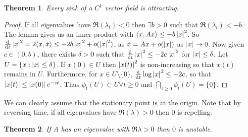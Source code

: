 \documentclass{notes}
\theoremstyle{plain}
\newtheorem*{theorem}{Theorem}
\begin{document}
\begin{theorem}
Every sink of a $C^1$ vector field is attracting.
\end{theorem}

\begin{proof}
If all eigenvalues have $\Re (\lambda_i) < 0$ then $\exists b > 0$ such
that $\Re (\lambda_i) < -b$.  The lemma gives us an inner product with
$\langle x, Ax \rangle \le -b \left|x\right|^2$.  So $\frac{\mathrm{d}}{\mathrm{d} t}\left|x\right|^2 =
2 \langle x, \dot{x} \rangle \le -2 b \left|x\right|^2 + o(\left|x\right|^2)$, as
$\dot{x} = A x + o(\left|x\right|)$ as $\left|x\right| \rightarrow 0$.  Now given
$c \in (0,b)$, there exists $\delta > 0$ such that $\frac{\mathrm{d}}{\mathrm{d} t} \left|x\right|^2
\le -2 c \left|x\right|^2$ for $\left|x\right| \le \delta$.  Let
$U = \{x : \left|x\right| \le \delta \}$.  If $x(0) \in U$ then $\left|x(t)\right|^2$ is
non-increasing so that $x(t)$ remains in $U$.  Furthermore, for $x \in U 
\setminus \{ 0 \}$, $\frac{\mathrm{d}}{\mathrm{d} t} \log \left|x\right|^2 \le -2 c$, so that
$\left|x(t)\right| \le \left|x(0)\right| e^{-c t}$.  Thus $\phi_t(U) \subset U \forall t
\ge 0$ and $\bigcap_{t \ge 0} \phi_t(U) = \{0 \}$.
\end{proof}

We can clearly assume that the stationary point is at the origin.  
Note that by reversing time, if all eigenvalues have $\Re(\lambda) > 0$
then $0$ is repelling.

\begin{theorem}
If $A$ has an eigenvalue with $\Re \lambda > 0$ then $0$ is unstable.
\end{theorem}
\end{document}
